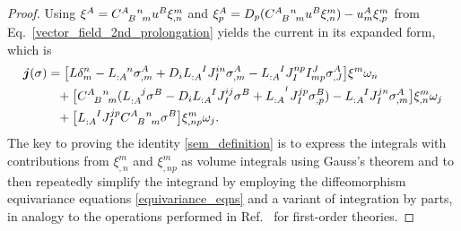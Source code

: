 \begin{proof}
  Using $\xi^A = \gmc{A}{B}{n}{m}u^B\xi^m_{,n}$ and $\xi^A_p = D_p(\gmc{A}{B}{n}{m}u^B\xi^m_{,n})-u^A_m\xi^m_{,p}$ from Eq.~\ref{vector_field_2nd_prolongation} yields the current in its expanded form, which is
  \begin{equation}\label{sem_calculation_current}
    \begin{aligned}
      \boldsymbol{j}(\sigma) &{} = \big\lbrack L\delta^n_m - L_{:A}^{\hphantom{:A}n}\sigma^A_{,m} + D_iL_{:A}^{\hphantom{:A}I}J_I^{in}\sigma^A_{,m}-L_{:A}^{\hphantom{:A}I}J_I^{np}I^J_{mp}\sigma^A_{,J}\big\rbrack \xi^m \omega_n \\
                             &{} \hphantom{=} + \big\lbrack \gmc{A}{B}{n}{m}(L_{:A}^{\hphantom{:A}j}\sigma^B - D_iL_{:A}^{\hphantom{:A}I}J_{I}^{ij}\sigma^B + L_{:A}^{\hphantom{:A}^I}J_{I}^{jp}\sigma^B_{,p}) - L_{:A}^{\hphantom{:A}I} J_I^{jn} \sigma^A_{,m}\big\rbrack \xi^m_{,n}\omega_j \\
                             &{} \hphantom{=} + \big\lbrack L_{:A}^{\hphantom{:A}I} J_I^{jp} \gmc{A}{B}{n}{m}\sigma^B\big\rbrack \xi^m_{,np}\omega_j.
    \end{aligned}
  \end{equation}
  The key to proving the identity \eqref{sem_definition} is to express the integrals with contributions from $\xi^m_{,n}$ and $\xi^m_{,np}$ as volume integrals using Gauss's theorem and to then repeatedly simplify the integrand by employing the diffeomorphism equivariance equations \eqref{equivariance_eqns} and a variant of integration by parts, in analogy to the operations performed in Ref.~\cite{Gotay_1992} for first-order theories.


\end{proof}
